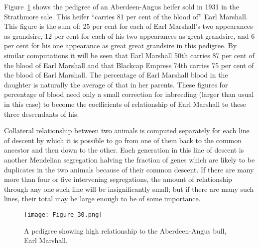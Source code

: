 Figure~\ref{fig:Lush_Figure_30} shows the pedigree of an Aberdeen-Angus heifer sold in
1931 in the Strathmore sale. This heifer ``carries 81 per cent of the
blood of'' Earl Marshall. This figure is the sum of: 25 per cent for each
of Earl Marshall's two appearances as grandsire, 12 per cent for each
of his two appearances as great grandsire, and 6 per cent for his one
appearance as great great grandsire in this pedigree. By similar computations
it will be seen that Earl Marshall 50th carries 87 per cent of
the blood of Earl Marshall and that Blackcap Empress 74th carries 75
per cent of the blood of Earl Marshall. The percentage of Earl Marshall
blood in the daughter is naturally the average of that in her parents.
These figures for percentage of blood need only a small correction for
inbreeding (larger than usual in this case) to become the coefficients of
relationship of Earl Marshall to these three descendants of his.

Collateral relationship between two animals is computed separately
for each line of descent by which it is possible to go from one of them
back to the common ancestor and then down to the other. Each generation
in this line of descent is another Mendelian segregation halving the
fraction of genes which are likely to be duplicates in the two animals
because of their common descent. If there are many more than four or
five intervening segregations, the amount of relationship through any
one such line will be insignificantly small; but if there are many such
lines, their total may be large enough to be of some importance.
\noclub[2]

\begin{figure}
	\centering
    \texttt{[image: Figure\_30.png]}
    \caption{A pedigree showing high relationship to the Aberdeen-Angus bull, Earl
			 Marshall.}
    \label{fig:Lush_Figure_30}
\end{figure}

